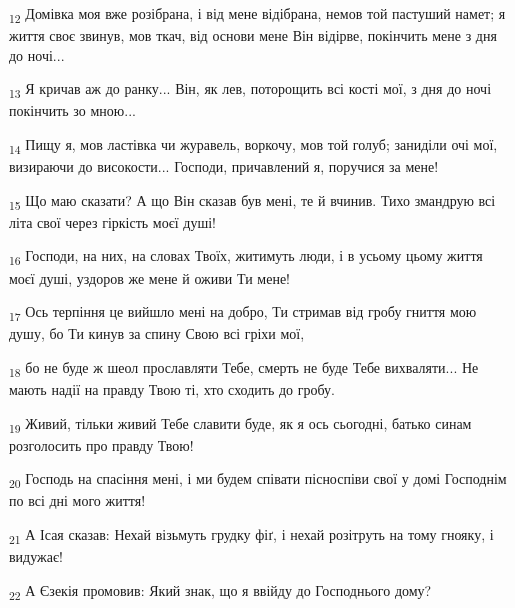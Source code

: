 \begin{tcolorbox}
\textsubscript{12} Домівка моя вже розібрана, і від мене відібрана, немов той пастуший намет; я життя своє звинув, мов ткач, від основи мене Він відірве, покінчить мене з дня до ночі...
\end{tcolorbox}
\begin{tcolorbox}
\textsubscript{13} Я кричав аж до ранку... Він, як лев, поторощить всі кості мої, з дня до ночі покінчить зо мною...
\end{tcolorbox}
\begin{tcolorbox}
\textsubscript{14} Пищу я, мов ластівка чи журавель, воркочу, мов той голуб; заниділи очі мої, визираючи до високости... Господи, причавлений я, поручися за мене!
\end{tcolorbox}
\begin{tcolorbox}
\textsubscript{15} Що маю сказати? А що Він сказав був мені, те й вчинив. Тихо змандрую всі літа свої через гіркість моєї душі!
\end{tcolorbox}
\begin{tcolorbox}
\textsubscript{16} Господи, на них, на словах Твоїх, житимуть люди, і в усьому цьому життя моєї душі, уздоров же мене й оживи Ти мене!
\end{tcolorbox}
\begin{tcolorbox}
\textsubscript{17} Ось терпіння це вийшло мені на добро, Ти стримав від гробу гниття мою душу, бо Ти кинув за спину Свою всі гріхи мої,
\end{tcolorbox}
\begin{tcolorbox}
\textsubscript{18} бо не буде ж шеол прославляти Тебе, смерть не буде Тебе вихваляти... Не мають надії на правду Твою ті, хто сходить до гробу.
\end{tcolorbox}
\begin{tcolorbox}
\textsubscript{19} Живий, тільки живий Тебе славити буде, як я ось сьогодні, батько синам розголосить про правду Твою!
\end{tcolorbox}
\begin{tcolorbox}
\textsubscript{20} Господь на спасіння мені, і ми будем співати пісноспіви свої у домі Господнім по всі дні мого життя!
\end{tcolorbox}
\begin{tcolorbox}
\textsubscript{21} А Ісая сказав: Нехай візьмуть грудку фіґ, і нехай розітруть на тому гнояку, і видужає!
\end{tcolorbox}
\begin{tcolorbox}
\textsubscript{22} А Єзекія промовив: Який знак, що я ввійду до Господнього дому?
\end{tcolorbox}
